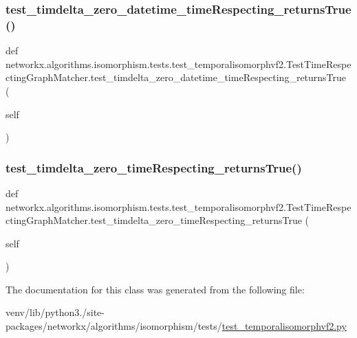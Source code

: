 \subsubsection{\texorpdfstring{test\+\_\+timdelta\+\_\+zero\+\_\+datetime\+\_\+time\+Respecting\+\_\+returns\+True()}{test\_timdelta\_zero\_datetime\_timeRespecting\_returnsTrue()}}
{\footnotesize\ttfamily def networkx.\+algorithms.\+isomorphism.\+tests.\+test\+\_\+temporalisomorphvf2.\+Test\+Time\+Respecting\+Graph\+Matcher.\+test\+\_\+timdelta\+\_\+zero\+\_\+datetime\+\_\+time\+Respecting\+\_\+returns\+True (\begin{DoxyParamCaption}\item[{}]{self }\end{DoxyParamCaption})}

\mbox{\label{classnetworkx_1_1algorithms_1_1isomorphism_1_1tests_1_1test__temporalisomorphvf2_1_1TestTimeRespectingGraphMatcher_ab593a1b5f1b54b8667a5e12d99dbcc86}} 
\subsubsection{\texorpdfstring{test\+\_\+timdelta\+\_\+zero\+\_\+time\+Respecting\+\_\+returns\+True()}{test\_timdelta\_zero\_timeRespecting\_returnsTrue()}}
{\footnotesize\ttfamily def networkx.\+algorithms.\+isomorphism.\+tests.\+test\+\_\+temporalisomorphvf2.\+Test\+Time\+Respecting\+Graph\+Matcher.\+test\+\_\+timdelta\+\_\+zero\+\_\+time\+Respecting\+\_\+returns\+True (\begin{DoxyParamCaption}\item[{}]{self }\end{DoxyParamCaption})}



The documentation for this class was generated from the following file\+:\begin{DoxyCompactItemize}
\item 
venv/lib/python3./site-\/packages/networkx/algorithms/isomorphism/tests/\hyperlink{test__temporalisomorphvf2_8py}{test\+\_\+temporalisomorphvf2.\+py}\end{DoxyCompactItemize}
